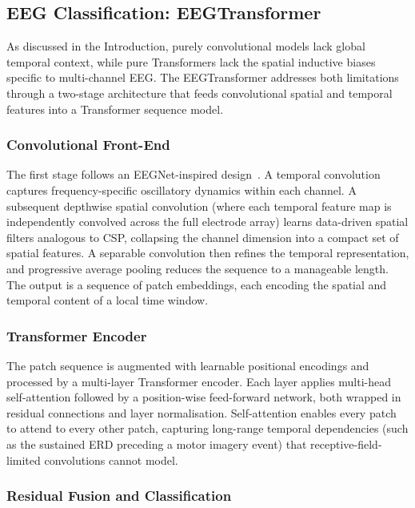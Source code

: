 \documentclass[12pt, a4paper]{article}
\begin{document}
\subsection{EEG Classification: EEGTransformer}

As discussed in the Introduction, purely convolutional models lack global temporal context, while pure Transformers lack the spatial inductive biases specific to multi-channel EEG. The EEGTransformer addresses both limitations through a two-stage architecture that feeds convolutional spatial and temporal features into a Transformer sequence model.

\subsubsection{Convolutional Front-End}

The first stage follows an EEGNet-inspired design~\cite{lawhern2018eegnet}. A temporal convolution captures frequency-specific oscillatory dynamics within each channel. A subsequent depthwise spatial convolution (where each temporal feature map is independently convolved across the full electrode array) learns data-driven spatial filters analogous to CSP, collapsing the channel dimension into a compact set of spatial features. A separable convolution then refines the temporal representation, and progressive average pooling reduces the sequence to a manageable length. The output is a sequence of patch embeddings, each encoding the spatial and temporal content of a local time window.

\subsubsection{Transformer Encoder}

The patch sequence is augmented with learnable positional encodings and processed by a multi-layer Transformer encoder. Each layer applies multi-head self-attention followed by a position-wise feed-forward network, both wrapped in residual connections and layer normalisation. Self-attention enables every patch to attend to every other patch, capturing long-range temporal dependencies (such as the sustained ERD preceding a motor imagery event) that receptive-field-limited convolutions cannot model.

\subsubsection{Residual Fusion and Classification}
\end{document}
